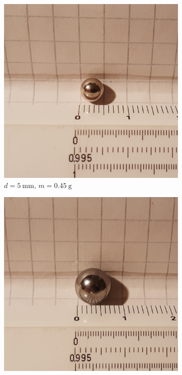 \documentclass[12pt]{article}
\begin{document}
\begin{figure}
    \begin{subfigure}[b]{.3\textwidth}
        \includegraphics[width = \textwidth]{figures/koule5.jpg}
        \caption{$d = \SI{5}{\milli\metre}\text{, }m = \SI{0,45}{\gram}$}
    \end{subfigure}
    \hfill
    \begin{subfigure}[b]{.3\textwidth}
        \includegraphics[width = \textwidth]{figures/koule8.jpg}

\end{subfigure}
\end{figure}
\end{document}
